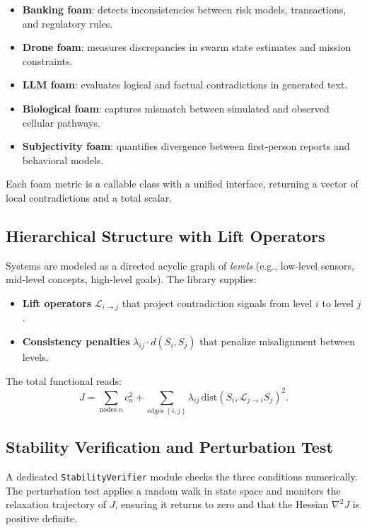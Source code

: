\documentclass[11pt,a4paper]{article}
\begin{document}
\begin{itemize}
    \item \textbf{Banking foam}: detects inconsistencies between risk models, transactions, and regulatory rules.
    \item \textbf{Drone foam}: measures discrepancies in swarm state estimates and mission constraints.
    \item \textbf{LLM foam}: evaluates logical and factual contradictions in generated text.
    \item \textbf{Biological foam}: captures mismatch between simulated and observed cellular pathways.
    \item \textbf{Subjectivity foam}: quantifies divergence between first‑person reports and behavioral models.
\end{itemize}

Each foam metric is a callable class with a unified interface, returning a vector of local contradictions and a total scalar.

\subsection{Hierarchical Structure with Lift Operators}
Systems are modeled as a directed acyclic graph of \textit{levels} (e.g., low‑level sensors, mid‑level concepts, high‑level goals). The library supplies:

\begin{itemize}
    \item \textbf{Lift operators} $\mathcal{L}_{i\to j}$ that project contradiction signals from level $i$ to level $j$.
    \item \textbf{Consistency penalties} $\lambda_{ij} \cdot d(S_i, S_j)$ that penalize misalignment between levels.
\end{itemize}

The total functional reads:
\begin{equation}
J = \sum_{\text{nodes }n} c_n^2 + \sum_{\text{edges }(i,j)} \lambda_{ij} \, \text{dist}(S_i, \mathcal{L}_{j\to i} S_j)^2.
\end{equation}

\subsection{Stability Verification and Perturbation Test}
A dedicated \texttt{StabilityVerifier} module checks the three conditions numerically. The perturbation test applies a random walk in state space and monitors the relaxation trajectory of $J$, ensuring it returns to zero and that the Hessian $\nabla^2 J$ is positive definite.
\end{document}
